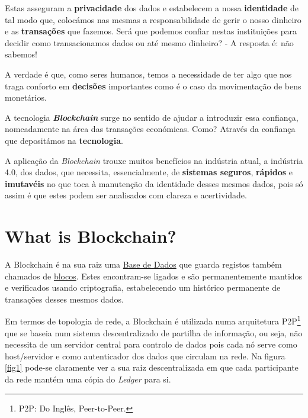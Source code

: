 \documentclass{llncs}
\begin{document}
\vspace{0.05cm}

Estas asseguram a \textbf{privacidade} dos dados e estabelecem a nossa \textbf{identidade} de tal modo que, colocámos nas mesmas a responsabilidade de gerir o nosso dinheiro e as \textbf{transações} que fazemos. Será que podemos confiar nestas instituições para decidir como transacionamos dados ou até mesmo dinheiro? - A resposta é: não sabemos! \par 

\vspace{0.05cm}

A verdade é que, como seres humanos, temos a necessidade de ter algo que nos traga conforto em \textbf{decisões} importantes como é o caso da movimentação de bens monetários.  \par

\vspace{0.05cm}

A tecnologia \textbf{\textit{Blockchain}} surge no sentido de ajudar a introduzir essa confiança, nomeadamente na área das transações económicas. Como? Através da confiança que depositámos na \textbf{tecnologia}. \par

\vspace{0.05cm}

A aplicação da \textit{Blockchain} trouxe muitos benefícios na indústria atual, a indústria 4.0, dos dados, que necessita, essencialmente, de \textbf{sistemas seguros}, \textbf{rápidos} e \textbf{imutavéis} no que toca à manutenção da identidade desses mesmos dados, pois só assim é que estes podem ser analisados com clareza e acertividade. 


\section{What is Blockchain?}

	A Blockchain é na sua raiz uma \underline{Base de Dados} que guarda registos também chamados de \underline{blocos}. Estes encontram-se ligados e são permanentemente mantidos e verificados usando criptografia, estabelecendo um histórico permanente de transações desses mesmos dados. \par
	
	\vspace{0.05cm}

	Em termos de topologia de rede, a Blockchain é utilizada numa arquitetura P2P\footnote{P2P: Do Inglês, Peer-to-Peer.} que se baseia num sistema descentralizado de partilha de informação, ou seja, não necessita de um servidor central para controlo de dados pois cada nó serve como host/servidor e como autenticador dos dados que circulam na rede. Na figura \ref{fig1} pode-se claramente ver a sua raiz descentralizada em que cada participante da rede mantém uma cópia do \textit{Ledger} para si. \par
\end{document}
